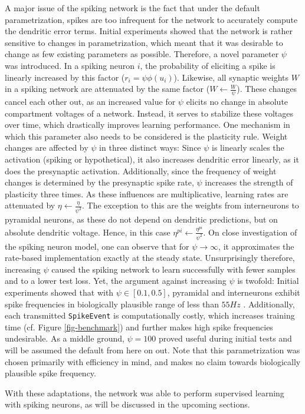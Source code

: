 A major issue of the spiking network is the fact that under the default parametrization, spikes are too infrequent for
the network to accurately compute the dendritic error terms. Initial experiments showed that the network is rather
sensitive to changes in parametrization, which meant that it was desirable to change as few existing parameters as
possible. Therefore, a novel parameter $\psi$ was introduced. In a spiking neuron $i$, the probability of eliciting a
spike is linearly increased by this factor ($r_i = \psi \phi(u_i)$). Likewise, all synaptic weights $W$ in a spiking
network are attenuated by the same factor ($W \leftarrow \frac{W}{\psi}$). These changes cancel each other out, as an
increased value for $\psi$ elicits no change in absolute compartment voltages of a network. Instead, it serves to
stabilize these voltages over time, which drastically improves learning performance. One mechanism in which this
parameter also needs to be considered is the plasticity rule. Weight changes are affected by $\psi$ in three distinct
ways: Since $\psi$ is linearly scales the activation (spiking or hypothetical), it also increases dendritic error
linearly, as it does the presynaptic activation. Additionally, since the frequency of weight changes is determined by
the presynaptic spike rate, $\psi$ increases the strength of plasticity three times. As these influences are
multiplicative, learning rates are attenuated by $\eta \leftarrow \frac{\eta}{\psi^3}$. The exception to this are the
weights from interneurons to pyramidal neurons, as these do not depend on dendritic predictions, but on absolute
dendritic voltage. Hence, in this case $\eta^{pi} \leftarrow\frac{\eta^{pi}}{\psi^2}$. On close investigation of the
spiking neuron model, one can observe that for $\psi \rightarrow \infty$, it approximates the rate-based implementation
exactly at the steady state. Unsurprisingly therefore, increasing $\psi$ caused the spiking network to learn
successfully with fewer samples and to a lower test loss. Yet, the argument against increasing $\psi$ is twofold:
Initial experiments showed that with $\psi \in [0.1, 0.5]$, pyramidal and interneurons exhibit spike frequencies in
biologically plausible range of less than $55Hz$ \cite{Kawaguchi2001,Eyal2018} . Additionally, each
transmitted \texttt{SpikeEvent} is computationally costly, which increases training time (cf. Figure
\ref{fig-benchmark}) and further makes high spike frequencies undesirable. As a middle ground, $\psi = 100$ proved
useful during initial tests and will be assumed the default from here on out. Note that this parametrization was chosen
primarily with efficiency in mind, and makes no claim towards biologically plausible spike frequency.

With these adaptations, the network was able to perform supervised learning with spiking neurons, as will be discussed
in the upcoming sections.


